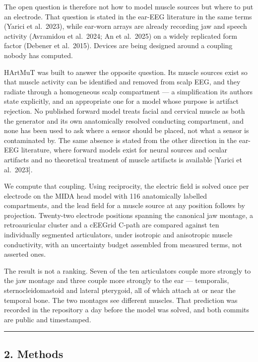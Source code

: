 \documentclass[
  11pt,
  letterpaper,
]{article}
\newcounter{none} %
\begin{document}
The open question is therefore not how to model muscle sources but where to
put an electrode. That question is stated in the ear-EEG literature in the
same terms (Yarici et al.~2023), while ear-worn arrays are already recording
jaw and speech activity (Avramidou et al.~2024; An et al.~2025) on a widely
replicated form factor (Debener et al.~2015). Devices are being designed
around a coupling nobody has computed.

HArtMuT was built to answer the opposite question. Its muscle sources exist so
that muscle activity can be identified and removed from scalp EEG, and they
radiate through a homogeneous scalp compartment --- a simplification its authors
state explicitly, and an appropriate one for a model whose purpose is artifact
rejection. No published forward model treats facial and cervical muscle as both
the generator and its own anatomically resolved conducting compartment, and none
has been used to ask where a sensor should be placed, not what a sensor is
contaminated by. The same absence is stated from the other direction in the
ear-EEG literature, where forward models exist for neural sources and ocular
artifacts and no theoretical treatment of muscle artifacts is available {[}Yarici
et al.~2023{]}.

We compute that coupling. Using reciprocity, the electric field is solved once
per electrode on the MIDA head model with 116 anatomically labelled
compartments, and the lead field for a muscle source at any position follows by
projection. Twenty-two electrode positions spanning the canonical jaw montage, a
retroauricular cluster and a cEEGrid C-path are compared against ten
individually segmented articulators, under isotropic and anisotropic muscle
conductivity, with an uncertainty budget assembled from measured terms, not
asserted ones.

The result is not a ranking. Seven of the ten articulators couple more strongly
to the jaw montage and three couple more strongly to the ear --- temporalis,
sternocleidomastoid and lateral pterygoid, all of which attach at or near the
temporal bone. The two montages see different muscles. That prediction was
recorded in the repository a day before the model was solved, and both commits
are public and timestamped.

\begin{center}\rule{0.5\linewidth}{0.5pt}\end{center}

\subsection{2. Methods}\label{methods}
\end{document}
